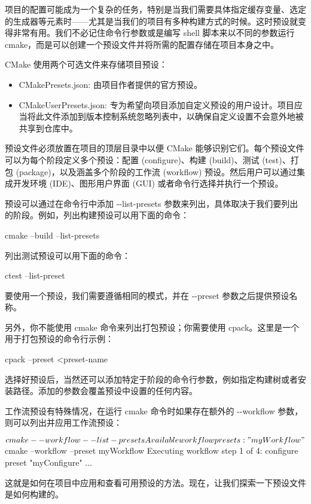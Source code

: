 项目的配置可能成为一个复杂的任务，特别是当我们需要具体指定缓存变量、选定的生成器等元素时——尤其是当我们的项目有多种构建方式的时候。这时预设就变得非常有用。我们不必记住命令行参数或是编写 shell 脚本来以不同的参数运行 cmake，而是可以创建一个预设文件并将所需的配置存储在项目本身之中。

CMake 使用两个可选文件来存储项目预设：

\begin{itemize}
\item
CMakePresets.json: 由项目作者提供的官方预设。

\item
CMakeUserPresets.json: 专为希望向项目添加自定义预设的用户设计。项目应当将此文件添加到版本控制系统忽略列表中，以确保自定义设置不会意外地被共享到仓库中。
\end{itemize}

预设文件必须放置在项目的顶层目录中以便 CMake 能够识别它们。每个预设文件可以为每个阶段定义多个预设：配置 (configure)、构建 (build)、测试 (test)、打包 (package)，以及涵盖多个阶段的工作流 (workflow) 预设。然后用户可以通过集成开发环境 (IDE)、图形用户界面 (GUI) 或者命令行选择并执行一个预设。

预设可以通过在命令行中添加 -{}-list-presets 参数来列出，具体取决于我们要列出的阶段。例如，列出构建预设可以用下面的命令：

\begin{shell}
cmake --build --list-presets
\end{shell}

列出测试预设可以用下面的命令：

\begin{shell}
ctest --list-preset
\end{shell}

要使用一个预设，我们需要遵循相同的模式，并在 -{}-preset 参数之后提供预设名称。

另外，你不能使用 cmake 命令来列出打包预设；你需要使用 cpack。这里是一个用于打包预设的命令行示例：

\begin{shell}
cpack --preset <preset-name
\end{shell}

选择好预设后，当然还可以添加特定于阶段的命令行参数，例如指定构建树或者安装路径。添加的参数会覆盖预设中设置的任何内容。

工作流预设有特殊情况，在运行 cmake 命令时如果存在额外的 -{}-workflow 参数，则可以列出并应用工作流预设：

\begin{shell}
$ cmake --workflow --list-presets
Available workflow presets:
    "myWorkflow"
$ cmake --workflow --preset myWorkflow
Executing workflow step 1 of 4: configure preset "myConfigure"
...
\end{shell}

这就是如何在项目中应用和查看可用预设的方法。现在，让我们探索一下预设文件是如何构建的。

























